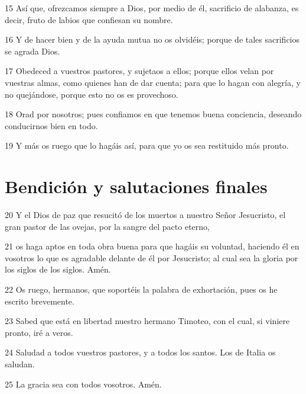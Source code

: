 \par 15 Así que, ofrezcamos siempre a Dios, por medio de él, sacrificio de alabanza, es decir, fruto de labios que confiesan su nombre.
\par 16 Y de hacer bien y de la ayuda mutua no os olvidéis; porque de tales sacrificios se agrada Dios.
\par 17 Obedeced a vuestros pastores, y sujetaos a ellos; porque ellos velan por vuestras almas, como quienes han de dar cuenta; para que lo hagan con alegría, y no quejándose, porque esto no os es provechoso.
\par 18 Orad por nosotros; pues confiamos en que tenemos buena conciencia, deseando conducirnos bien en todo.
\par 19 Y más os ruego que lo hagáis así, para que yo os sea restituido más pronto.

\section*{Bendición y salutaciones finales}

\par 20 Y el Dios de paz que resucitó de los muertos a nuestro Señor Jesucristo, el gran pastor de las ovejas, por la sangre del pacto eterno,
\par 21 os haga aptos en toda obra buena para que hagáis su voluntad, haciendo él en vosotros lo que es agradable delante de él por Jesucristo; al cual sea la gloria por los siglos de los siglos. Amén.
\par 22 Os ruego, hermanos, que soportéis la palabra de exhortación, pues os he escrito brevemente.
\par 23 Sabed que está en libertad nuestro hermano Timoteo, con el cual, si viniere pronto, iré a veros.
\par 24 Saludad a todos vuestros pastores, y a todos los santos. Los de Italia os saludan.
\par 25 La gracia sea con todos vosotros. Amén.

